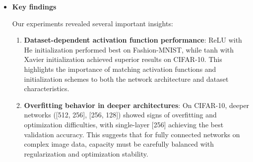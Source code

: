 \begin{itemize}
    Contrary to initial expectations, we found that single-layer networks even outperformed deeper ones on CIFAR-10. Our best result was achieved with a single hidden layer of 256 units using tanh activation and Xavier initialization, reaching 80.9\% validation accuracy (Run 101, epoch 113). However, this validation accuracy did not fully translate to test performance, with test accuracy around 52\%, indicating some overfitting to the validation set or differences in data distribution.
    
    We found that tanh activation outperformed ReLU with a slight margin on CIFAR-10, achieving validation accuracies in the range of 65-81\% depending on configuration, compared to ReLU's typical range of 50-65\%. However, overall performance varied significantly with hyperparameter configuration, with many runs converging around 50-55\% test accuracy, meaning the model was not able to capture intricate details of RGB images without convolutional operations.
    
    Optimal hyperparameters for CIFAR-10 differed substantially from Fashion-MNIST: learning rates of 0.0026-0.0049 (8-16x higher than Fashion-MNIST), L2 regularization of 0.0026-0.0042 (20-40x higher), dropout rates of 0.059-0.129, and batch sizes of 24-80. Training required 67-113 epochs for best runs to converge, with some configurations needing up to 194 epochs.
    
    \item \textbf{Key findings}
    
    Our experiments revealed several important insights:
    
    \begin{enumerate}
        \item \textbf{Dataset-dependent activation function performance}: ReLU with He initialization performed best on Fashion-MNIST, while tanh with Xavier initialization achieved superior results on CIFAR-10. This highlights the importance of matching activation functions and initialization schemes to both the network architecture and dataset characteristics.
        
        \item \textbf{Overfitting behavior in deeper architectures}: On CIFAR-10, deeper networks ([512, 256], [256, 128]) showed signs of overfitting and optimization difficulties, with single-layer [256] achieving the best validation accuracy. This suggests that for fully connected networks on complex image data, capacity must be carefully balanced with regularization and optimization stability.
        

\end{enumerate}
\end{itemize}
